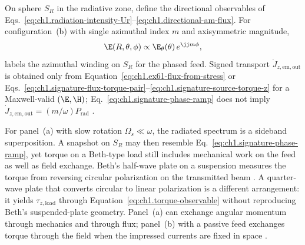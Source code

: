 On sphere \(S_R\) in the radiative zone, define the directional observables of
Eqs.~\eqref{eq:ch1.radiation-intensity-Ur}--\eqref{eq:ch1.directional-am-flux}.
For configuration~(b) with single azimuthal index \(m\) and axisymmetric magnitude,
\begin{equation}
\label{eq:ch1.signature-phase-ramp}
\E(R,\theta,\phi)\propto \E_\theta(\theta)\,e^{\jj m\phi},
\end{equation}
labels the azimuthal winding on $S_R$ for the phased feed. Signed transport $\dot J_{z,\mathrm{em,out}}$ is obtained only from Equation~\eqref{eq:ch1.ex61-flux-from-stress} or Eqs.~\eqref{eq:ch1.signature-flux-torque-pair}--\eqref{eq:ch1.signature-source-torque-z} for a Maxwell-valid $(\E,\H)$; Eq.~\eqref{eq:ch1.signature-phase-ramp} does not imply $\dot J_{z,\mathrm{em,out}}=(m/\omega)P_{\mathrm{rad}}$ \cite{stratton1941,allen1992}.

For panel~(a) with slow rotation \(\Omega_s\ll\omega\), the radiated spectrum is a sideband superposition. A snapshot on \(S_R\) may then resemble Eq.~\eqref{eq:ch1.signature-phase-ramp}, yet torque on a Beth-type load still includes mechanical work on the feed as well as field exchange. Beth's half-wave plate on a suspension measures the torque from reversing circular polarization on the transmitted beam \cite{beth1936}. A quarter-wave plate that converts circular to linear polarization is a different arrangement: it yields \(\tau_{z,\mathrm{load}}\) through Equation~\eqref{eq:ch1.torque-observable} without reproducing Beth's suspended-plate geometry. Panel~(a) can exchange angular momentum through mechanics and through flux; panel~(b) with a passive feed exchanges torque through the field when the impressed currents are fixed in space \cite{stratton1941}.

